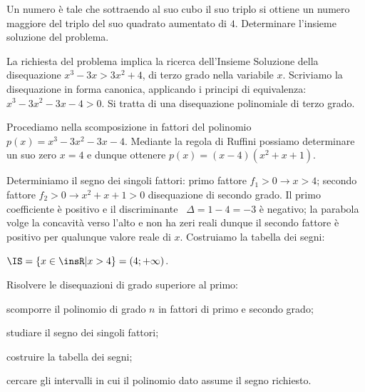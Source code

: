 \begin{exrig}
\begin{esempio}
Un numero è tale che sottraendo al suo cubo il suo triplo si ottiene un numero maggiore del triplo del suo quadrato aumentato di $ 4 $. Determinare l’insieme soluzione del problema.

La richiesta del problema implica la ricerca dell’Insieme Soluzione della disequazione $x^3-3x>3x^2+4$, di terzo grado nella variabile $x$. Scriviamo la disequazione in forma canonica, applicando i principi di equivalenza: $x^3-3x^2-3x-4>0$. Si tratta di una disequazione polinomiale di terzo grado.

Procediamo nella scomposizione in fattori del polinomio $p(x)=x^3-3x^2-3x-4$. Mediante la regola di Ruffini possiamo determinare un suo zero $x=4$ e dunque ottenere $p(x)=(x-4)(x^2+x+1)$.

Determiniamo il segno dei singoli fattori: primo fattore $f_1>0\to x>4$; secondo fattore $f_2>0\to x^2+x+1>0$ disequazione di secondo grado. Il primo coefficiente è positivo e il discriminante \ $\Delta =1-4=-3$ è negativo; la parabola volge la concavità verso l'alto e non ha zeri reali dunque il secondo fattore è positivo per qualunque valore reale di $x$. Costruiamo la tabella dei segni:
\begin{center}
 
\end{center}
$\IS=\{x\in \insR | x>4\}=(4;+\infty )$.
\end{esempio}
\end{exrig}

\begin{procedura}
Risolvere le disequazioni di grado superiore al primo:
\begin{enumeratea}
\item scomporre il polinomio di grado $n$ in fattori di primo e secondo grado;
\item studiare il segno dei singoli fattori;
\item costruire la tabella dei segni;
\item cercare gli intervalli in cui il polinomio dato assume il segno richiesto.
\end{enumeratea}
\end{procedura}

